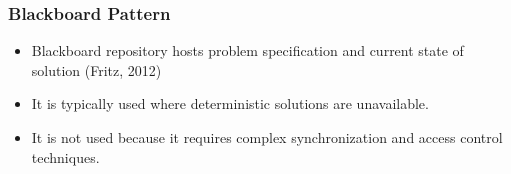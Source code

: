 \documentclass[a4paper,12pt]{article}
\begin{document}
\subsubsection{Blackboard Pattern}
\begin{itemize}
\item Blackboard repository hosts problem specification and current state of solution (Fritz, 2012)
\item It is typically used where deterministic solutions are unavailable.
\item It is not used because it requires complex synchronization and access control techniques. 
\end{itemize}
\end{document}
